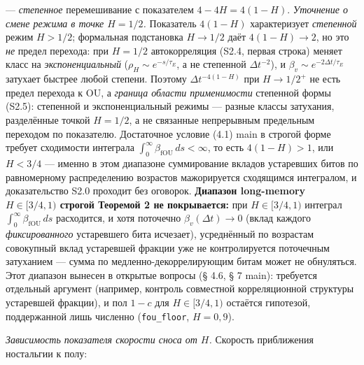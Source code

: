 \documentclass[12pt]{iopart}
\begin{document}
--- \emph{степенное} перемешивание с показателем \(4-4H = 4(1-H)\). \emph{Уточнение о смене режима в точке \(H = 1/2\).} Показатель \(4(1-H)\) характеризует \emph{степенной} режим \(H > 1/2\); формальная подстановка \(H \to 1/2\) даёт \(4(1-H) \to 2\), но это \emph{не} предел перехода: при \(H = 1/2\) автокорреляция (S2.4, первая строка) меняет класс на \emph{экспоненциальный} (\(\rho_H \sim e^{-s/\tau_E}\), а не степенной \(\Delta t^{-2}\)), и \(\beta_v \sim e^{-2\Delta t/\tau_E}\) затухает быстрее любой степени. Поэтому \(\Delta t^{-4(1-H)}\) при \(H \to 1/2^+\) не есть предел перехода к OU, а \emph{граница области применимости} степенной формы (S2.5): степенной и экспоненциальный режимы --- разные классы затухания, разделённые точкой \(H = 1/2\), а не связанные непрерывным предельным переходом по показателю. Достаточное условие (4.1) main в строгой форме требует сходимости интеграла \(\int_0^\infty\beta_{\text{fOU}}\,ds < \infty\), то есть \(4(1-H) > 1\), или \(H < 3/4\) --- именно в этом диапазоне суммирование вкладов устаревших битов по равномерному распределению возрастов мажорируется сходящимся интегралом, и доказательство S2.0 проходит без оговорок. \textbf{Диапазон long-memory \(H \in [3/4, 1)\) строгой Теоремой 2 не покрывается:} при \(H \in [3/4, 1)\) интеграл \(\int_0^\infty\beta_{\text{fOU}}\,ds\) расходится, и хотя поточечно \(\beta_v(\Delta t) \to 0\) (вклад каждого \emph{фиксированного} устаревшего бита исчезает), усреднённый по возрастам совокупный вклад устаревшей фракции уже не контролируется поточечным затуханием --- сумма по медленно-декоррелирующим битам может не обнуляться. Этот диапазон вынесен в открытые вопросы (§ 4.6, § 7 main): требуется отдельный аргумент (например, контроль совместной корреляционной структуры устаревшей фракции), и пол \(1-c\) для \(H \in [3/4,1)\) остаётся гипотезой, поддержанной лишь численно (\texttt{fou\_floor}, \(H = 0{,}9\)).



\emph{Зависимость показателя скорости сноса от \(H\).} Скорость приближения ностальгии к полу:
\end{document}
